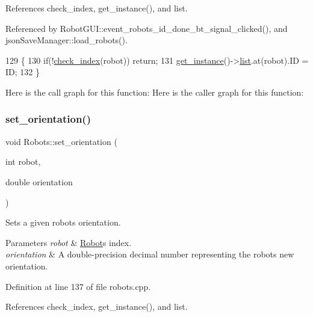 References check\+\_\+index, get\+\_\+instance(), and list.



Referenced by Robot\+G\+U\+I\+::event\+\_\+robots\+\_\+id\+\_\+done\+\_\+bt\+\_\+signal\+\_\+clicked(), and json\+Save\+Manager\+::load\+\_\+robots().


\begin{DoxyCode}
129                                       \{
130     \textcolor{keywordflow}{if}(!\hyperlink{robots_8hpp_ae3e6ae8f87cdc750c0b99bc609d9ae43}{check\_index}(robot)) \textcolor{keywordflow}{return};
131     \hyperlink{class_robots_a589bce74db5f34af384952d48435168f}{get\_instance}()->\hyperlink{class_robots_a2c6b77265028f82a4342ca1ef15ed305}{list}.at(robot).ID = ID;
132 \}
\end{DoxyCode}
Here is the call graph for this function\+:
Here is the caller graph for this function\+:
\mbox{\label{class_robots_a9040aa6c409fe67186aaa52f9183b7c1}} 
\subsubsection{\texorpdfstring{set\+\_\+orientation()}{set\_orientation()}}
{\footnotesize\ttfamily void Robots\+::set\+\_\+orientation (\begin{DoxyParamCaption}\item[{int}]{robot,  }\item[{double}]{orientation }\end{DoxyParamCaption})\hspace{0.3cm}{\ttfamily [static]}}

Sets a given robot\textquotesingle{}s orientation. 
\begin{DoxyParams}{Parameters}
{\em robot} & \hyperlink{struct_robots_1_1_robot}{Robot}\textquotesingle{}s index. \\
\hline
{\em orientation} & A double-\/precision decimal number representing the robot\textquotesingle{}s new orientation. \\
\hline
\end{DoxyParams}


Definition at line 137 of file robots.\+cpp.



References check\+\_\+index, get\+\_\+instance(), and list.



